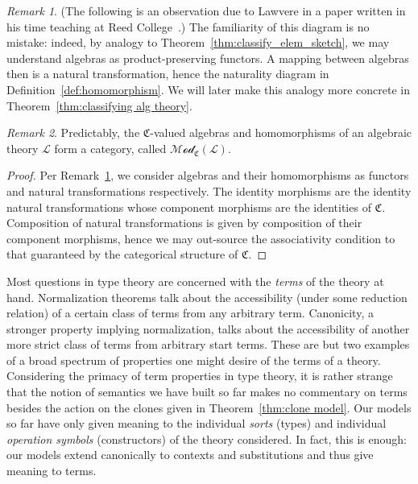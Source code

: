 \documentclass[12pt,twoside]{reedthesis}
\theoremstyle{definition}
\theoremstyle{remark}
\newtheorem{remark}{Remark}
\theoremstyle{plain}
\begin{document}
\begin{remark}\label{rmk:alg_func}
  (The following is an observation due to Lawvere in a paper written in his time
  teaching at Reed College~\cite{lawvere_functorial_1963}.) The familiarity of
  this diagram is no mistake: indeed, by analogy to
  Theorem~\ref{thm:classify_elem_sketch}, we may understand algebras as
  product-preserving functors. A mapping between algebras then is a natural
  transformation, hence the naturality diagram in
  Definition~\ref{def:homomorphism}. We will later make this analogy more
  concrete in Theorem~\ref{thm:classifying alg theory}.
\end{remark}

\begin{remark}
  Predictably, the $\mathfrak{C}$-valued algebras and homomorphisms of an
  algebraic theory $\mathcal{L}$ form a category, called
  $\mathscr{Mod}_{\mathfrak{C}}(\mathcal{L})$.
  \begin{proof}
    Per Remark~\ref{rmk:alg_func}, we consider algebras and their homomorphisms
    as functors and natural transformations respectively. The identity morphisms
    are the identity natural transformations whose component morphisms are the
    identities of $\mathfrak{C}$. Composition of natural transformations is
    given by composition of their component morphisms, hence we may out-source
    the associativity condition to that guaranteed by the categorical structure
    of $\mathfrak{C}$.
  \end{proof}

\end{remark}

Most questions in type theory are concerned with the \emph{terms} of the theory
at hand. Normalization theorems talk about the accessibility (under some
reduction relation) of a certain class of terms from any arbitrary term.
Canonicity, a stronger property implying normalization, talks about the
accessibility of another more strict class of terms from arbitrary start terms.
These are but two examples of a broad spectrum of properties one might desire of
the terms of a theory. Considering the primacy of term properties in type
theory, it is rather strange that the notion of semantics we have built so far
makes no commentary on terms besides the action on the clones given in
Theorem~\ref{thm:clone model}. Our models so far have only given meaning to the
individual \emph{sorts} (types) and individual \emph{operation symbols}
(constructors) of the theory considered. In fact, this is enough: our models
extend canonically to contexts and substitutions and thus give meaning to terms.
\end{document}
